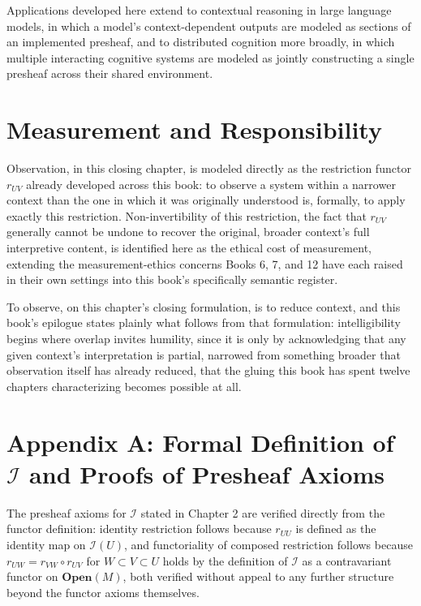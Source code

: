 Applications developed here extend to contextual reasoning in large language models, in which a model's context-dependent outputs are modeled as sections of an implemented presheaf, and to distributed cognition more broadly, in which multiple interacting cognitive systems are modeled as jointly constructing a single presheaf across their shared environment.

\chapter{Measurement and Responsibility}

Observation, in this closing chapter, is modeled directly as the restriction functor $r_{UV}$ already developed across this book: to observe a system within a narrower context than the one in which it was originally understood is, formally, to apply exactly this restriction. Non-invertibility of this restriction, the fact that $r_{UV}$ generally cannot be undone to recover the original, broader context's full interpretive content, is identified here as the ethical cost of measurement, extending the measurement-ethics concerns Books 6, 7, and 12 have each raised in their own settings into this book's specifically semantic register.

To observe, on this chapter's closing formulation, is to reduce context, and this book's epilogue states plainly what follows from that formulation: intelligibility begins where overlap invites humility, since it is only by acknowledging that any given context's interpretation is partial, narrowed from something broader that observation itself has already reduced, that the gluing this book has spent twelve chapters characterizing becomes possible at all.

\chapter*{Appendix A: Formal Definition of $\mathcal{I}$ and Proofs of Presheaf Axioms}

The presheaf axioms for $\mathcal{I}$ stated in Chapter 2 are verified directly from the functor definition: identity restriction follows because $r_{UU}$ is defined as the identity map on $\mathcal{I}(U)$, and functoriality of composed restriction follows because $r_{UW} = r_{VW} \circ r_{UV}$ for $W \subset V \subset U$ holds by the definition of $\mathcal{I}$ as a contravariant functor on $\mathbf{Open}(M)$, both verified without appeal to any further structure beyond the functor axioms themselves.


